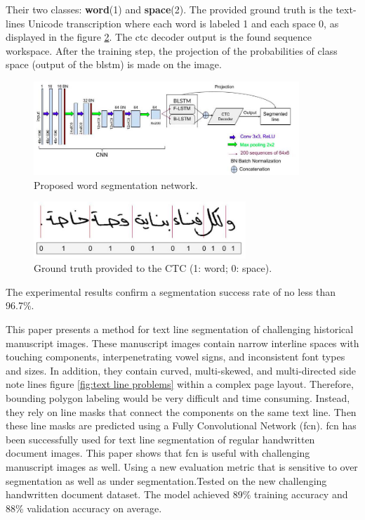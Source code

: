 \begin{itemize}[labelindent=1em,labelsep=0.25cm,leftmargin=*]
        Their two classes: \textbf{word}(1) and \textbf{space}(2). The
        provided ground truth is the text-lines Unicode transcription
        where each word is labeled 1 and each space 0, as displayed in the figure \ref{fig:word_seg}. The \acrshort{ctc} decoder output is the found sequence workspace. After the training step, the projection of the probabilities of class space (output of the \acrshort{blstm}) is made on the image.
        \begin{figure}[!htb]
        \centering
        \includegraphics[width=10cm]{images/seg_network.png}
        \caption{Proposed word segmentation network.}
        \label{fig:seg_network}
        \end{figure}
        
        \begin{figure}[!htb]
        \centering
        \includegraphics[width=8cm]{images/word_seg.png}
        \caption{Ground truth provided to the CTC (1: word; 0: space).}
        \label{fig:word_seg}
        \end{figure}
    The experimental results confirm a segmentation success rate of no less than 96.7\%. 
 \end{itemize}

This paper \cite{FCN} presents a method for text line segmentation
of challenging historical manuscript images. These manuscript images contain narrow interline spaces with touching components, interpenetrating vowel signs, and inconsistent font types and sizes. In addition, they contain curved, multi-skewed, and multi-directed side note lines figure \ref{fig:text line problems} within a complex page layout. Therefore, bounding polygon labeling would be very difficult and time consuming. Instead, they rely on line masks that connect the components on the same text line. Then these line masks are predicted using a Fully Convolutional Network (\acrshort{fcn}). \acrshort{fcn} has been successfully used for text line segmentation of regular handwritten document images. This paper shows that \acrshort{fcn} is useful with challenging manuscript images as well. Using a new evaluation metric that is sensitive to over segmentation as well as under segmentation.Tested on the new challenging handwritten document dataset. The model achieved 89\% training accuracy and 88\% validation accuracy on average.

